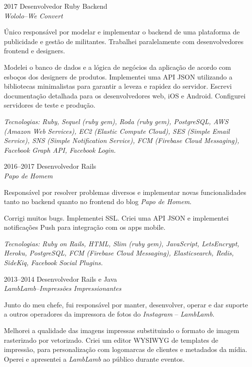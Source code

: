 \documentclass[a4paper]{simplecv}
\begin{document}
\begin{topic}
\item[2017] Desenvolvedor Ruby Backend\\
	{\em\small Wololo--We Convert}

	Único responsável por modelar e implementar o backend de uma
	plataforma de publicidade e gestão de militantes. Trabalhei
	paralelamente com desenvolvedores frontend e designers.

	Modelei o banco de dados e a lógica de negócios da aplicação de acordo
	com esboços dos designers de produtos. Implementei uma API JSON
	utilizando a bibliotecas minimalistas para garantir a leveza e rapidez
	do servidor. Escrevi documentação detalhada para os desenvolvedores
	web, iOS e Android. Configurei servidores de teste e produção.

	{\em\scriptsize Tecnologias: Ruby, Sequel (ruby gem), Roda (ruby gem),
	PostgreSQL, AWS (Amazon Web Services), EC2 (Elastic Compute Cloud), SES
	(Simple Email Service), SNS (Simple Notification Service), FCM
	(Firebase Cloud Messaging), Facebook Graph API, Facebook Login.}

\item[2016--2017] Desenvolvedor Rails\\
	{\em\small Papo de Homem}

	Responsável por resolver problemas diversos e implementar novas
	funcionalidades tanto no backend quanto no frontend do blog \emph{Papo
	de Homem}.

	Corrigi muitos bugs. Implementei SSL. Criei uma API JSON e implementei
	notificações Push para integração com os apps mobile.

	{\em\scriptsize Tecnologias: Ruby on Rails, HTML, Slim (ruby gem),
	JavaScript, LetsEncrypt, Heroku, PostgreSQL, FCM (Firebase Cloud
	Messaging), Elasticsearch, Redis, SideKiq, Facebook Social Plugins.}

\item[2013--2014] Desenvolvedor Rails e Java\\
	{\em\small LambLamb--Impressões Impressionantes}

	Junto do meu chefe, fui responsável por manter, desenvolver, operar e
	dar suporte a outros operadores da impressora de fotos do
	\emph{Instagram} -- \emph{LambLamb}.

	Melhorei a qualidade das imagens impressas substituindo o formato de
	imagem rasterizado por vetorizado. Criei um editor WYSIWYG de templates
	de impressão, para personalização com logomarcas de clientes e
	metadados da mídia. Operei e apresentei a \emph{LambLamb} ao público
	durante eventos.


\end{topic}
\end{document}
